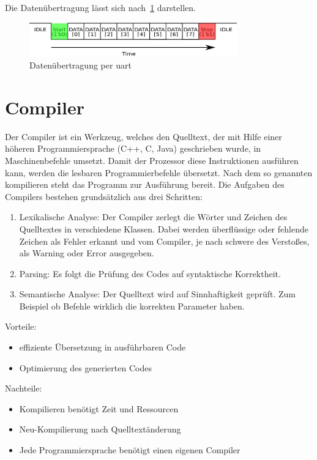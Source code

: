 Die Datenübertragung lässt sich nach~\ref{fig:uart} darstellen.\\

\begin{figure}[h!]
\centering
\includegraphics[width=0.8\textwidth]{Hauptteil/uart.eps}
\caption{Datenübertragung per \ac{uart} }
\label{fig:uart}
\end{figure}

\section{Compiler}\label{kap:compiler}

Der Compiler ist ein Werkzeug, welches den Quelltext, der mit Hilfe einer höheren Programmiersprache (C++, C, Java) geschrieben wurde, in Maschinenbefehle umsetzt. Damit der Prozessor diese Instruktionen ausführen kann, werden die lesbaren Programmierbefehle übersetzt. Nach dem so genannten kompilieren steht das Programm zur Ausführung bereit.
Die Aufgaben des Compilers bestehen grundsätzlich aus drei Schritten:\cite{compiler}
\begin{enumerate}
  \item Lexikalische Analyse:
  	Der Compiler zerlegt die Wörter und Zeichen des Quelltextes in verschiedene Klassen. Dabei werden überflüssige oder fehlende Zeichen als Fehler erkannt und vom Compiler, je nach
  schwere des Verstoßes, als Warning oder Error ausgegeben.
  \item Parsing:
  	Es folgt die Prüfung des Codes auf syntaktische Korrektheit.
  \item Semantische Analyse: Der Quelltext wird auf Sinnhaftigkeit geprüft. Zum Beispiel ob Befehle wirklich die korrekten Parameter haben.
\end{enumerate}

Vorteile:
\begin{itemize}
  \item effiziente Übersetzung in ausführbaren Code
  \item Optimierung des generierten Codes
\end{itemize}

Nachteile:
\begin{itemize}
  \item Kompilieren benötigt Zeit und Ressourcen
  \item Neu-Kompilierung nach Quelltextänderung
  \item Jede Programmiersprache benötigt einen eigenen Compiler
\end{itemize}

